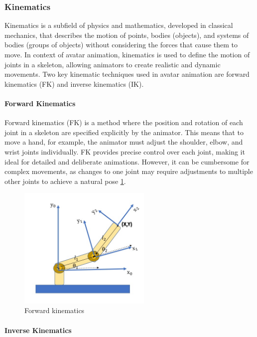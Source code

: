 \documentclass[../../main.tex]{subfiles}
\begin{document}
\subsubsection{Kinematics}

Kinematics is a subfield of physics and mathematics, developed in classical mechanics, that describes the motion of points, bodies (objects), and systems of bodies (groups of objects) without considering the forces that cause them to move. In context of avatar animation, kinematics is used to define the motion of joints in a skeleton, allowing animators to create realistic and dynamic movements. Two key kinematic techniques used in avatar animation are forward kinematics (FK) and inverse kinematics (IK).

\paragraph{Forward Kinematics}

Forward kinematics (FK) is a method where the position and rotation of each joint in a skeleton are specified explicitly by the animator. This means that to move a hand, for example, the animator must adjust the shoulder, elbow, and wrist joints individually. FK provides precise control over each joint, making it ideal for detailed and deliberate animations. However, it can be cumbersome for complex movements, as changes to one joint may require adjustments to multiple other joints to achieve a natural pose \ref{fig:forward_kinematics_example}.

\begin{figure}
  \centering \includegraphics[width = 2.5in]{chapters/background_work/images/forward_kinematics_example.png}
  \caption{Forward kinematics}
  \label{fig:forward_kinematics_example}
\end{figure}

\paragraph{Inverse Kinematics}
\end{document}
